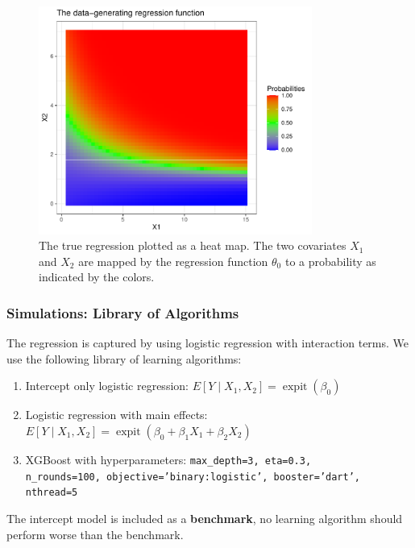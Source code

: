 \documentclass{beamer}
\DeclareMathOperator{\expit}{expit}
\begin{document}
\begin{frame}
\begin{figure}[H]
    \centering
    \includegraphics[width=0.8\textwidth]{figures/trueplot.pdf}
    \caption{The true regression plotted as a heat map. The two covariates $ X_1 $ and $ X_2 $ are mapped by the regression function $ \theta_0 $ to a probability as indicated by the colors.}
    \label{fig:trueplot}
\end{figure}
\end{frame}


\begin{frame}
    \frametitle{Simulations: Library of Algorithms} 
The regression is captured by using logistic regression with interaction terms. We use the following library of learning algorithms:
\begin{enumerate}
    \item Intercept only logistic regression: $E[Y \mid X_1, X_2] = \expit(\beta_0)$
    \item Logistic regression with main effects: $E[Y \mid X_1, X_2] = \expit(\beta_0 + \beta_1 X_1 + \beta_2 X_2)$
    \item XGBoost with hyperparameters: \texttt{max\_depth=3, eta=0.3,\\ n\_rounds=100, objective='binary:logistic', booster='dart', nthread=5}
\end{enumerate}
The intercept model is included as a \textbf{benchmark}, no learning algorithm should perform worse than the benchmark. 


\end{frame}
\end{document}
